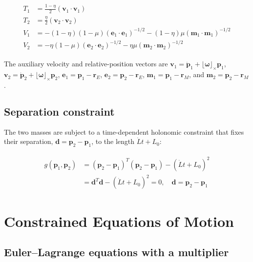 \documentclass[]{article}
\begin{document}
\begin{align}
\begin{split}
    T_1 &= \frac{1-\eta}{2} \left(\mathbf{v}_1 \cdot \mathbf{v}_1\right) \\
    T_2 &= \frac{\eta}{2} \left(\mathbf{v}_2 \cdot \mathbf{v}_2\right) \\
    V_1 &= -(1-\eta)(1-\mu) (\mathbf{e}_1 \cdot \mathbf{e}_1)^{-1/2} - (1-\eta)\mu (\mathbf{m}_1 \cdot \mathbf{m}_1)^{-1/2} \\
    V_2 &= -\eta(1-\mu) (\mathbf{e}_2 \cdot \mathbf{e}_2)^{-1/2} - \eta \mu (\mathbf{m}_2 \cdot \mathbf{m}_2)^{-1/2}
\end{split}
\end{align}

The auxiliary velocity and relative-position vectors are $\mathbf{v}_1 = \dot{\mathbf{p}}_1 + \lfloor \boldsymbol{\omega} \rfloor_\times \mathbf{p}_1$, $\mathbf{v}_2 = \dot{\mathbf{p}}_2 + \lfloor \boldsymbol{\omega} \rfloor_\times \mathbf{p}_2$, $\mathbf{e}_1 = \mathbf{p}_1 - \mathbf{r}_E$, $\mathbf{e}_2 = \mathbf{p}_2 - \mathbf{r}_E$, $\mathbf{m}_1 = \mathbf{p}_1 - \mathbf{r}_M$, and $\mathbf{m}_2 = \mathbf{p}_2 - \mathbf{r}_M$.

\subsection{Separation constraint}

The two masses are subject to a time-dependent holonomic constraint that fixes their separation, $\mathbf{d} = \mathbf{p}_2 - \mathbf{p}_1$, to the length $\dot{L} t + L_0$:

\begin{align}
\begin{split}
    g(\mathbf{p}_1, \mathbf{p}_2) &= (\mathbf{p}_2 - \mathbf{p}_1)^T(\mathbf{p}_2 - \mathbf{p}_1) - (\dot{L} t + L_0)^2 \\
    &= \mathbf{d}^T \mathbf{d} - (\dot{L} t + L_0)^2 = 0, \quad \mathbf{d} = \mathbf{p}_2 - \mathbf{p}_1
\end{split}
\end{align}

\section{Constrained Equations of Motion}
\label{sec:eoms}

\subsection{Euler--Lagrange equations with a multiplier}
\end{document}
